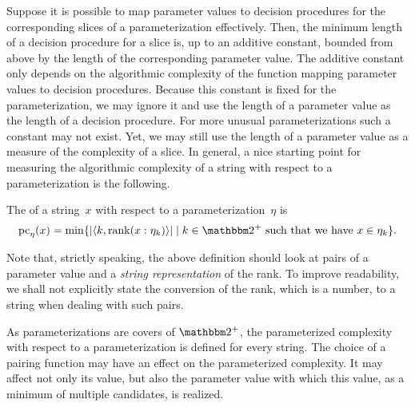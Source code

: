 Suppose it is possible to map parameter values to decision procedures for the corresponding slices of a parameterization effectively.
Then, the minimum length of a decision procedure for a slice is, up to an additive constant, bounded from above by the length of the corresponding parameter value.
The additive constant only depends on the algorithmic complexity of the function mapping parameter values to decision procedures.
Because this constant is fixed for the parameterization, we may ignore it and use the length of a parameter value as the length of a decision procedure.
For more unusual parameterizations such a constant may not exist.
Yet, we may still use the length of a parameter value as a measure of the complexity of a slice.
In general, a nice starting point for measuring the algorithmic complexity of a string with respect to a parameterization is the following.
\begin{definition}
\label{def:pc}%
  The  of a string~$x$ with respect to a parameterization~$\eta$ is
  \begin{equation*}
    \pc_\eta(x) \deq \min\{\length{\pair{k}{\rank(x : \eta_k)}} \st k \in \binary^+\text{ such that we have $x \in \eta_k$}\}.
  \end{equation*}
\end{definition}

Note that, strictly speaking, the above definition should look at pairs of a parameter value and a \emph{string representation} of the rank.
To improve readability, we shall not explicitly state the conversion of the rank, which is a number, to a string when dealing with such pairs.

As parameterizations are covers of $\binary^+$, the parameterized complexity with respect to a parameterization is defined for every string.
The choice of a pairing function may have an effect on the parameterized complexity.
It may affect not only its value, but also the parameter value with which this value, as a minimum of multiple candidates, is realized.

